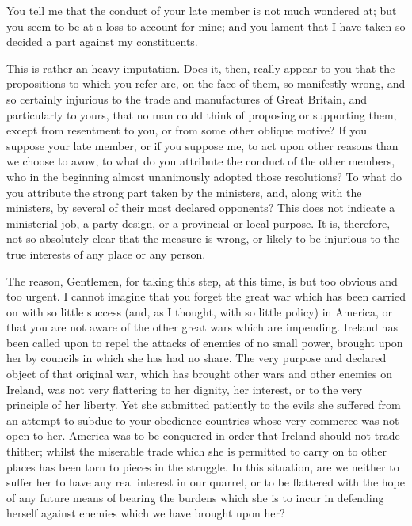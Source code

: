 You tell me that the conduct of your late member is not much wondered at; but you seem to be at a loss to account for mine; and you lament that I have taken so decided a part against my constituents.

This is rather an heavy imputation. Does it, then, really appear to you that the propositions to which you refer are, on the face of them, so manifestly wrong, and so certainly injurious to the trade and manufactures of Great Britain, and particularly to yours, that no man could think of proposing or supporting them, except from resentment to you, or from some other oblique motive? If you suppose your late member, or if you suppose me, to act upon other reasons than we choose to avow, to what do you attribute the conduct of the other members, who in the beginning almost unanimously adopted those resolutions? To what do you attribute the strong part taken by the ministers, and, along with the ministers, by several of their most declared opponents? This does not indicate a ministerial job, a party design, or a provincial or local purpose. It is, therefore, not so absolutely clear that the measure is wrong, or likely to be injurious to the true interests of any place or any person.

The reason, Gentlemen, for taking this step, at this time, is but too obvious and too urgent. I cannot imagine that you forget the great war which has been carried on with so little success (and, as I thought, with so little policy) in America, or that you are not aware of the other great wars which are impending. Ireland has been called upon to repel the attacks of enemies of no small power, brought upon her by councils in which she has had no share. The very purpose and declared object of that original war, which has brought other wars and other enemies on Ireland, was not very flattering to her dignity, her interest, or to the very principle of her liberty. Yet she submitted patiently to the evils she suffered from an attempt to subdue to your obedience countries whose very commerce was not open to her. America was to be conquered in order that Ireland should not trade thither; whilst the miserable trade which she is permitted to carry on to other places has been torn to pieces in the struggle. In this situation, are we neither to suffer her to have any real interest in our quarrel, or to be flattered with the hope of any future means of bearing the burdens which she is to incur in defending herself against enemies which we have brought upon her?

